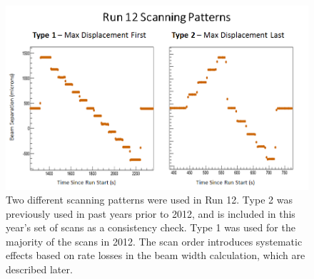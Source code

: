 \begin{figure}
\begin{center}
\includegraphics[width=0.75\linewidth]{../intro/figs/scan_patterns}
\caption{ Two different scanning patterns were used in Run 12. Type 2 was previously
used in past years prior to 2012, and is included in this year's set of scans as a consistency check.
Type 1 was used for the majority of the scans in 2012. The scan order introduces
systematic effects based on rate losses in the beam width calculation, which are described
later.}
\label{fig:scan_patterns}
\end{center}
\end{figure}
